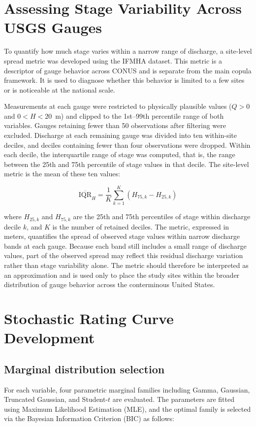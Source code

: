 \documentclass[11pt]{article}
\begin{document}
\newpage



\newpage \appendix
\section{Assessing Stage Variability Across USGS Gauges} \label{app:stage_variability}
To quantify how much stage varies within a narrow range of discharge, a site-level spread metric was developed using the IFMHA dataset. This metric is a descriptor of gauge behavior across CONUS and is separate from the main copula framework. It is used to diagnose whether this behavior is limited to a few sites or is noticeable at the national scale.

Measurements at each gauge were restricted to physically plausible values ($Q > 0$ and $0 < H < 20$~m) and clipped to the 1st--99th percentile range of both variables. Gauges retaining fewer than 50 observations after filtering were excluded. Discharge at each remaining gauge was divided into ten within-site deciles, and deciles containing fewer than four observations were dropped. Within each decile, the interquartile range of stage was computed, that is, the range between the 25th and 75th percentile of stage values in that decile. The site-level metric is the mean of these ten values:

\begin{equation}
    \overline{\text{IQR}}_H = \frac{1}{K} \sum_{k=1}^{K}
    \left( H_{75,k} - H_{25,k} \right)
    \label{eq:iqr_metric}
\end{equation}

where $H_{25,k}$ and $H_{75,k}$ are the 25th and 75th percentiles of stage within discharge decile $k$, and $K$ is the number of retained deciles. The metric, expressed in meters, quantifies the spread of observed stage values within narrow discharge bands at each gauge. Because each band still includes a small range of discharge values, part of the observed spread may reflect this residual discharge variation rather than stage variability alone. The metric should therefore be interpreted as an approximation and is used only to place the study sites within the broader distribution of gauge behavior across the conterminous United States.


\section{Stochastic Rating Curve Development} \label{app:src_development}
\subsection{Marginal distribution selection} 
For each variable, four parametric marginal families including Gamma, Gaussian, Truncated Gaussian, and Student-$t$ are evaluated. The parameters are fitted using Maximum Likelihood Estimation (MLE), and the optimal family is selected via the Bayesian Information Criterion (BIC) as follows:
\end{document}
